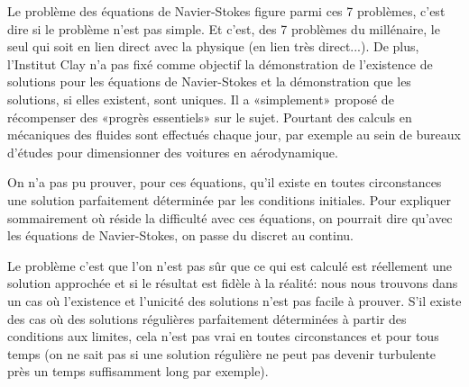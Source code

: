 \begin{histoire}
\medskip
Le problème des équations de Navier-Stokes  figure parmi ces 7 problèmes, c'est dire si le problème n'est pas simple. Et c'est, des 7 problèmes du millénaire, le seul qui soit en lien direct avec la physique (en lien très direct...). De plus, l'Institut Clay n'a pas fixé comme objectif la démonstration de l'existence de solutions pour les équations de Navier-Stokes et la démonstration que les solutions, si elles existent, sont uniques. Il a «simplement» proposé de récompenser des «progrès essentiels» sur le sujet. Pourtant des calculs en mécaniques des fluides sont effectués chaque jour, par exemple au sein de bureaux d'études pour dimensionner des voitures en aérodynamique.

On n'a pas pu prouver, pour ces équations, qu'il existe en toutes circonstances une solution parfaitement déterminée par les conditions initiales. Pour expliquer sommairement où réside la difficulté avec ces équations, on pourrait dire qu'avec les équations de Navier-Stokes, on passe du discret au continu.

\medskip
Le problème c'est que l'on n'est pas sûr que ce qui est calculé est réellement une solution approchée et si le résultat est fidèle à la réalité: nous nous trouvons dans un cas où l'existence et l'unicité des solutions n'est pas facile à prouver. S'il existe des cas où des solutions régulières parfaitement déterminées à partir des conditions aux limites, cela n'est pas vrai en toutes circonstances et pour tous temps (on ne sait pas si une solution régulière ne peut pas devenir turbulente près un temps suffisamment long par exemple).


\end{histoire}
